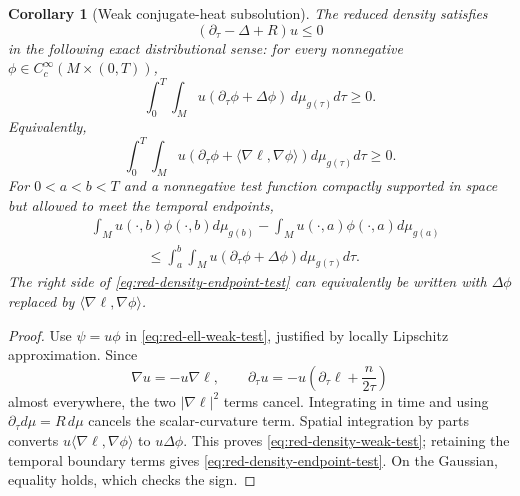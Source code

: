 \documentclass[10pt]{coll-l}
\newtheorem{corollary}[theorem]{Corollary}
\theoremstyle{definition}
\theoremstyle{remark}
\numberwithin{section}{chapter}
\numberwithin{equation}{chapter}
\begin{document}
\begin{corollary}[Weak conjugate-heat subsolution]
\label{cor:red-density-subsolution}
The reduced density satisfies
\begin{equation}
                  (\partial_\tau-\Delta+R)u\leq0        \label{eq:red-conjugate-subsolution}
\end{equation}
in the following exact distributional sense: for every nonnegative
$\phi\in C_c^\infty(M\times(0,T))$,
\begin{equation}
 \int_0^T\!\!\int_Mu(\partial_\tau\phi+\Delta\phi)
       \,d\mu_{g(\tau)}d\tau\geq0.                    \label{eq:red-density-weak-test}
\end{equation}
Equivalently,
\begin{equation}
 \int_0^T\!\!\int_Mu\left(\partial_\tau\phi
       +\langle\nabla\ell,\nabla\phi\rangle\right)
       d\mu_{g(\tau)}d\tau\geq0.                       \label{eq:red-density-weak-first-order}
\end{equation}
For $0<a<b<T$ and a nonnegative test function compactly supported in space
but allowed to meet the temporal endpoints,
\begin{align}
 &\int_Mu(\cdot,b)\phi(\cdot,b)d\mu_{g(b)}
 -\int_Mu(\cdot,a)\phi(\cdot,a)d\mu_{g(a)}             \label{eq:red-density-endpoint-test}\\
 &\hspace{4em}\leq
 \int_a^b\!\!\int_Mu(\partial_\tau\phi+\Delta\phi)
       d\mu_{g(\tau)}d\tau.\nonumber
\end{align}
The right side of \eqref{eq:red-density-endpoint-test} can equivalently be
written with $\Delta\phi$ replaced by
$\langle\nabla\ell,\nabla\phi\rangle$.
\end{corollary}

\begin{proof}
Use $\psi=u\phi$ in \eqref{eq:red-ell-weak-test}, justified by locally
Lipschitz approximation.  Since
\begin{equation}
 \nabla u=-u\nabla\ell,
 \qquad
 \partial_\tau u=-u\left(\partial_\tau\ell+\frac n{2\tau}\right)
                                                               \label{eq:red-density-derivatives}
\end{equation}
almost everywhere, the two $|\nabla\ell|^2$ terms cancel.  Integrating in
time and using $\partial_\tau d\mu=R\,d\mu$ cancels the scalar-curvature
term.  Spatial integration by parts converts
$u\langle\nabla\ell,\nabla\phi\rangle$ to $u\Delta\phi$.  This proves
\eqref{eq:red-density-weak-test}; retaining the temporal boundary terms
gives \eqref{eq:red-density-endpoint-test}.  On the Gaussian, equality holds,
which checks the sign.
\end{proof}
\end{document}
